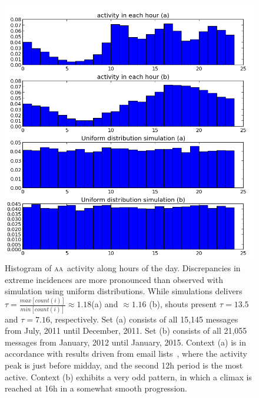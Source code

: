 \documentclass[a4paper, 11pt]{article} %
\newcommand{\aab}{\textsc{aa}}
\begin{document}
\begin{figure}[H]
    \hspace{-25mm}
    \includegraphics[width=1.3\textwidth]{imgs/hourHist}
    \caption{\small Histogram of \aab\ activity along hours of the day. Discrepancies in extreme incidences are more pronounced than observed with simulation using uniform distributions. While simulations delivers $\tau=\frac{max[count(i)]}{min[count(i)]}\approx1.18$(a) and $\approx 1.16$ (b), shouts present $\tau=13.5$ and $\tau=7.16$, respectively. Set (a) consists of all 15,145 messages from July, 2011 until December, 2011. Set (b) consists of all 21,055 messages from January, 2012 until January, 2015. Context (a) is in accordance with results driven from email lists~\cite{rc1}, where the activity peak is just before midday, and the second 12h period is the most active. Context (b) exhibits a very odd pattern, in which a climax is reached at 16h in a somewhat smooth progression.}\label{fig:histHour}
\end{figure}
\end{document}
